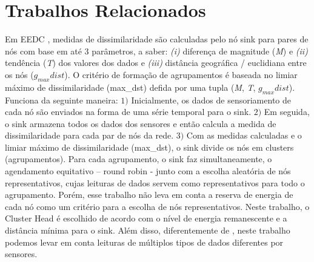 \documentclass{acm_proc_article-sp}
\begin{document}
\section{Trabalhos Relacionados}
\label{related-work}

Em EEDC \cite{Liu2007}, medidas de dissimilaridade são calculadas pelo 
nó sink para pares de nós com base em até $3$ parâmetros, a saber: {\it (i)}
diferença de magnitude (\textit{M}) e {\it (ii)} tendência (\textit{T}) dos
valores dos dados e {\it (iii)} distância geográfica / euclidiana entre
os nós ($g_{max}dist$).
O critério de formação de agrupamentos é baseada no limiar máximo de
dissimilaridade (max\_dst) defida por uma tupla (\textit{M}, \textit{T},
$g_{max}dist$). Funciona da seguinte maneira: $1)$ Inicialmente, os dados de
sensoriamento de cada nó são enviados na forma de uma série temporal para o
sink. $2)$ Em seguida, o sink armazena todos os dados dos sensores e então
calcula a medida de dissimilaridade para cada par de nós da rede. $3)$ Com as
medidas calculadas e o limiar máximo de dissimilaridade (max\_dst), o sink
divide os nós em clusters (agrupamentos). Para cada agrupamento, o sink faz
simultaneamente, o agendamento equitativo – round robin - junto com a escolha
aleatória de nós representativos, cujas leituras de dados servem como
representativos para todo o agrupamento. Porém, esse trabalho não leva em conta
a reserva de energia de cada nó como um critério para a escolha de nós
representativos. Neste trabalho, o Cluster Head é escolhido de acordo com o
nível de energia remanescente e a distância mínima para o sink.
Além disso, diferentemente de \cite{Liu2007}, neste trabalho podemos levar em
conta leituras de múltiplos tipos de dados diferentes por sensores.
\vspace*{-.3cm}
\end{document}
